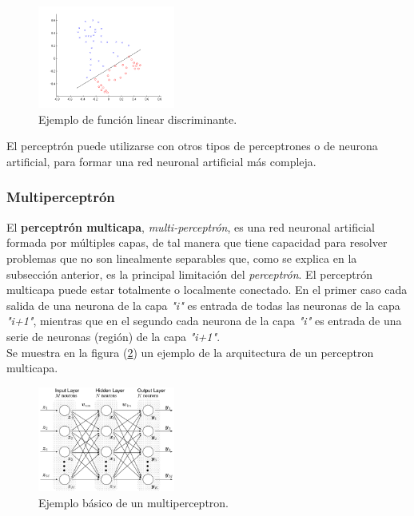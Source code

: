 \documentclass[osajnl,twocolumn,showpacs,superscriptaddress,10pt]{revtex4-1} %
\begin{document}
\begin{figure}[H]
    \centering
    \includegraphics[width=0.4\textwidth]{theory/linear}
    \caption{Ejemplo de función linear discriminante.}
    \label{figure:linear_example}
\end{figure}

El perceptrón puede utilizarse con otros tipos de perceptrones o de neurona artificial, para formar una red neuronal artificial más compleja.

\subsubsection{Multiperceptrón}

El \textbf{perceptrón multicapa}, \textit{multi-perceptrón}, es una red neuronal artificial formada por múltiples capas, de tal manera que tiene capacidad para resolver problemas que no son linealmente separables que, como se explica en la subsección anterior, es la principal limitación del \textit{perceptrón}. El perceptrón multicapa puede estar totalmente o localmente conectado. En el primer caso cada salida de una neurona de la capa \textit{"i"} es entrada de todas las neuronas de la capa \textit{"i+1"}, mientras que en el segundo cada neurona de la capa \textit{"i"} es entrada de una serie de neuronas (región) de la capa \textit{"i+1"}. \\

Se muestra en la figura (\ref{figure:multiperceptron_example}) un ejemplo de la arquitectura de un perceptron multicapa.

\begin{figure}[H]
    \centering
    \includegraphics[width=0.4\textwidth]{theory/multiperceptron}
    \caption{Ejemplo básico de un multiperceptron.}
    \label{figure:multiperceptron_example}
\end{figure}
\end{document}
